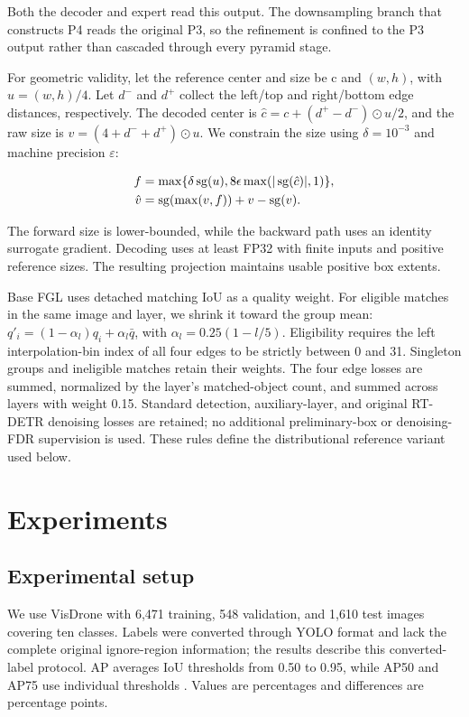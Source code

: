 Both the decoder and expert read this output. The downsampling branch that constructs P4 reads the original P3, so the refinement is confined to the P3 output rather than cascaded through every pyramid stage.


For geometric validity, let the reference center and size be c and $(w,h)$, with $u=(w,h)/4$. Let $d^-$ and $d^+$ collect the left/top and right/bottom edge distances, respectively. The decoded center is $\hat c=c+(d^+-d^-)\odot u/2$, and the raw size is $v=(4+d^-+d^+)\odot u$. We constrain the size using $\delta=10^{-3}$ and machine precision $\varepsilon$:


\begin{equation}\label{eq:7}
\begin{aligned}
f&=\max\{\delta\operatorname{sg}(u),8\epsilon\max(|\operatorname{sg}(\hat c)|,1)\},\\
\hat v&=\operatorname{sg}(\max(v,f))+v-\operatorname{sg}(v).
\end{aligned}\end{equation}

The forward size is lower-bounded, while the backward path uses an identity surrogate gradient. Decoding uses at least FP32 with finite inputs and positive reference sizes. The resulting projection maintains usable positive box extents.


Base FGL uses detached matching IoU as a quality weight. For eligible matches in the same image and layer, we shrink it toward the group mean: $q'_i=(1-\alpha_l)q_i+\alpha_l\bar q$, with $\alpha_l=0.25(1-l/5)$. Eligibility requires the left interpolation-bin index of all four edges to be strictly between 0 and 31. Singleton groups and ineligible matches retain their weights. The four edge losses are summed, normalized by the layer's matched-object count, and summed across layers with weight 0.15. Standard detection, auxiliary-layer, and original RT-DETR denoising losses are retained; no additional preliminary-box or denoising-FDR supervision is used. These rules define the distributional reference variant used below.


\section{Experiments}

\subsection{Experimental setup}

We use VisDrone with 6,471 training, 548 validation, and 1,610 test images covering ten classes. Labels were converted through YOLO format and lack the complete original ignore-region information; the results describe this converted-label protocol. AP averages IoU thresholds from 0.50 to 0.95, while AP50 and AP75 use individual thresholds \cite{lin2014coco}. Values are percentages and differences are percentage points.


